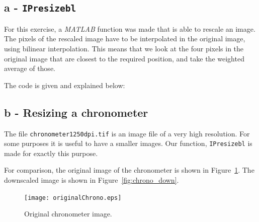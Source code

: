 \subsection*{a - \texttt{IPresizebl}}
For this exercise, a \textit{MATLAB} function was made that is able to rescale an image.
The pixels of the rescaled image have to be interpolated in the original image, using bilinear interpolation.
This means that we look at the four pixels in the original image that are closest to the required position, and take the weighted average of those.

The code is given and explained below:

\subsection*{b - Resizing a chronometer}
The file \texttt{chronometer1250dpi.tif} is an image file of a very high resolution.
For some purposes it is useful to have a smaller images.
Our function, \texttt{IPresizebl} is made for exactly this purpose.

For comparison, the original image of the chronometer is shown in Figure~\ref{fig:chrono_original0}.
The downscaled image is shown in Figure~\ref{fig:chrono_down}.

\begin{figure}[!Htb]
 \centering
 \texttt{[image: originalChrono.eps]}
 \caption{Original chronometer image.}
 \label{fig:chrono_original0}
\end{figure}

